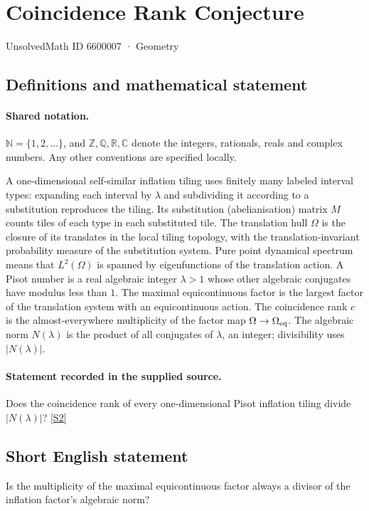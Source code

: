 \documentclass[11pt]{article}
\newcommand{\sref}[2]{\hyperlink{source:#1:#2}{[S#2]}}
\begin{document}
\setcounter{section}{6600006}
\section{Coincidence Rank Conjecture}\label{6600007}
{\small\sffamily UnsolvedMath ID 6600007 · Geometry}
\subsection{Definitions and mathematical statement}

\paragraph{Shared notation.}$\mathbb N=\{1,2,\ldots\}$, and $\mathbb Z,\mathbb Q,\mathbb R,\mathbb C$ denote the integers, rationals, reals and complex numbers. Any other conventions are specified locally.


A one-dimensional self-similar inflation tiling uses finitely many labeled interval types: expanding each interval by $\lambda$ and subdividing it according to a substitution reproduces the tiling. Its substitution (abelianisation) matrix $M$ counts tiles of each type in each substituted tile. The translation hull $\Omega$ is the closure of its translates in the local tiling topology, with the translation-invariant probability measure of the substitution system. Pure point dynamical spectrum means that $L^2(\Omega)$ is spanned by eigenfunctions of the translation action. A Pisot number is a real algebraic integer $\lambda>1$ whose other algebraic conjugates have modulus less than $1$. The maximal equicontinuous factor is the largest factor of the translation system with an equicontinuous action. The coincidence rank $c$ is the almost-everywhere multiplicity of the factor map $\Omega\to\Omega_{\rm eq}$. The algebraic norm $N(\lambda)$ is the product of all conjugates of $\lambda$, an integer; divisibility uses $|N(\lambda)|$.
\paragraph{Statement recorded in the supplied source.}
Does the coincidence rank of every one-dimensional Pisot inflation tiling divide $|N(\lambda)|$? \sref{6600007}{2}
\subsection{Short English statement}
Is the multiplicity of the maximal equicontinuous factor always a divisor of the inflation factor’s algebraic norm?
\end{document}
